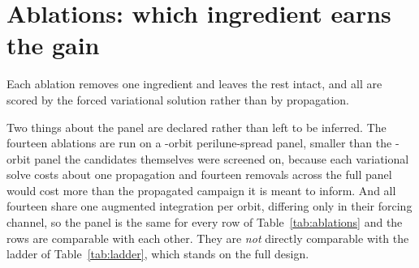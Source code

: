 \section{Ablations: which ingredient earns the gain}
\label{sec:ablations}

Each ablation removes one ingredient and leaves the rest intact, and all are
scored by the forced variational solution rather than by propagation.

Two things about the panel are declared rather than left to be inferred. The
fourteen ablations are run on a -orbit perilune-spread panel, smaller
than the -orbit panel the candidates themselves were screened on, because
each variational solve costs about one propagation and fourteen removals across
the full panel would cost more than the propagated campaign it is meant to
inform. And all fourteen share one augmented integration per orbit, differing
only in their forcing channel, so the panel is the same for every row of
Table~\ref{tab:ablations} and the rows are comparable with each other. They are
\emph{not} directly comparable with the ladder of Table~\ref{tab:ladder}, which
stands on the full design. 

